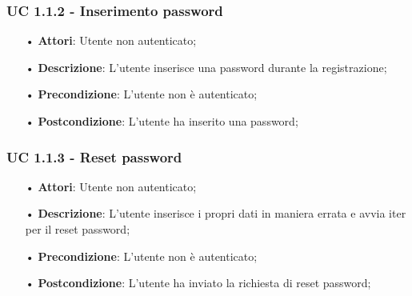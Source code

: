 \subsubsection{UC 1.1.2 - Inserimento password}
\begin{itemize}
\item[•]\textbf{Attori}: Utente non autenticato;
\item[•]\textbf{Descrizione}: L’utente inserisce una password durante la registrazione;
\item[•]\textbf{Precondizione}: L'utente non è autenticato;
\item[•]\textbf{Postcondizione}: L'utente ha inserito una password;
\end{itemize}

\subsubsection{UC 1.1.3 - Reset password}
\begin{itemize}
	\item[•]\textbf{Attori}: Utente non autenticato;
	\item[•]\textbf{Descrizione}: L’utente inserisce i propri dati in maniera errata e avvia iter per il reset password;
	\item[•]\textbf{Precondizione}: L’utente non è autenticato;
	\item[•]\textbf{Postcondizione}: L’utente ha inviato la richiesta di reset password;
\end{itemize}

